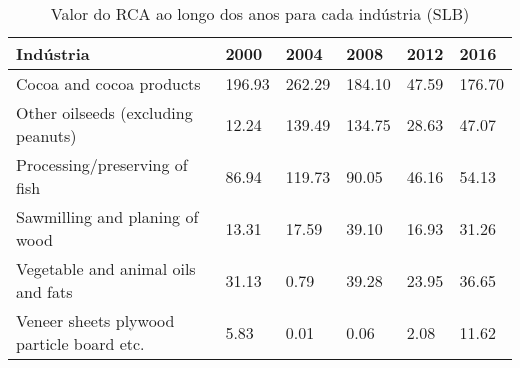 \begin{table}
\centering
\caption{Valor do RCA ao longo dos anos para cada indústria (SLB)}
\begin{tabular}{p{6cm}p{1.5cm}p{1.5cm}p{1.5cm}p{1.5cm}p{1.5cm}}
\toprule
                                Indústria &   2000 &   2004 &   2008 &  2012 &   2016 \\
\midrule
                 Cocoa and cocoa products & 196.93 & 262.29 & 184.10 & 47.59 & 176.70 \\
       Other oilseeds (excluding peanuts) &  12.24 & 139.49 & 134.75 & 28.63 &  47.07 \\
            Processing/preserving of fish &  86.94 & 119.73 &  90.05 & 46.16 &  54.13 \\
           Sawmilling and planing of wood &  13.31 &  17.59 &  39.10 & 16.93 &  31.26 \\
       Vegetable and animal oils and fats &  31.13 &   0.79 &  39.28 & 23.95 &  36.65 \\
Veneer sheets plywood particle board etc. &   5.83 &   0.01 &   0.06 &  2.08 &  11.62 \\
\bottomrule
\end{tabular}
\end{table}
